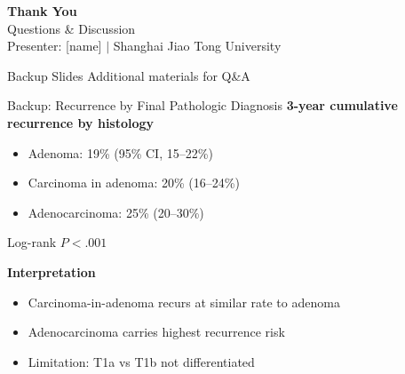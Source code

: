 \documentclass[aspectratio=169,10pt]{beamer}
\renewcommand{\neg}[1]{\textcolor{negative}{#1}}
\begin{document}
\begin{frame}
\centering
\vspace{1.5cm}
{\Large\bfseries Thank You}\\[12pt]
{\large Questions \& Discussion}\\[20pt]
\textcolor{neutral}{\small Presenter: [name] $\mid$ Shanghai Jiao Tong University}
\end{frame}

\appendix
\begin{frame}{Backup Slides}
\centering
{\large\textcolor{neutral}{Additional materials for Q\&A}}
\end{frame}

\begin{frame}{Backup: Recurrence by Final Pathologic Diagnosis}
\textbf{3-year cumulative recurrence by histology}
\begin{itemize}
  \item Adenoma: 19\% (95\% CI, 15--22\%)
  \item Carcinoma in adenoma: 20\% (16--24\%)
  \item Adenocarcinoma: 25\% (20--30\%)
\end{itemize}
Log-rank $P < .001$

\vspace{6pt}
\textbf{Interpretation}
\begin{itemize}
  \item Carcinoma-in-adenoma recurs at similar rate to adenoma
  \item Adenocarcinoma carries \neg{highest recurrence risk}
  \item Limitation: T1a vs T1b not differentiated
\end{itemize}
\end{frame}
\end{document}
